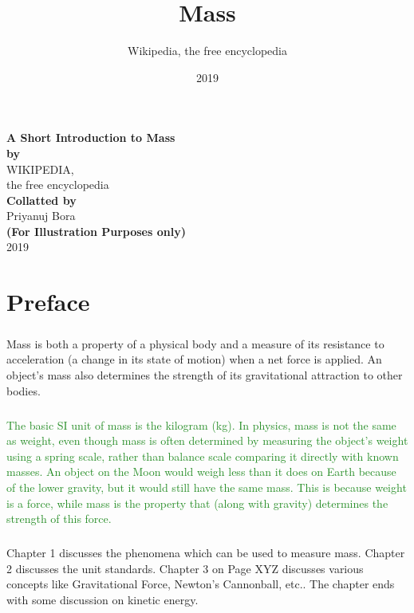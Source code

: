 \documentclass{book}
\title{Mass}
\author{Wikipedia, the free encyclopedia}
\date{2019}
\begin{document}
	\setlength{\columnsep}{20pt}
	\begin{center}
		\Huge\textbf{A Short Introduction to Mass\\ \LARGE by\\}\LARGE WIKIPEDIA,\\ the free encyclopedia\\\textbf{Collatted by}\\Priyanuj Bora\\\textbf{(For Illustration Purposes only)}\\2019
	\end{center}
	
	\chapter*{Preface}
	\paragraph{}
	\LARGE
	\textcolor{WildStrawberry}{Mass is both a property of a physical body and a measure of its resistance to acceleration (a change in its state of motion) when a net force is applied. An object's mass also determines the strength of its gravitational attraction to other bodies.}
	
	\paragraph{}
	\normalsize
	\textcolor{ForestGreen}{The basic SI unit of mass is the kilogram (kg). In physics, mass is not the same as weight, even though mass is often determined by measuring the object's weight using a spring scale, rather than balance scale comparing it directly with known masses. An object on the Moon would weigh less than it does on Earth because of the lower gravity, but it would still have the same mass. This is because weight is a force, while mass is the property that (along with gravity) determines the strength of this force.}

	\paragraph{}
	Chapter 1 discusses the phenomena which can be used to measure mass. Chapter 2 discusses the unit standards. Chapter 3 on Page XYZ discusses various concepts like Gravitational Force, Newton's Cannonball, etc.. The chapter ends with some discussion on kinetic energy.
	
\end{document}

